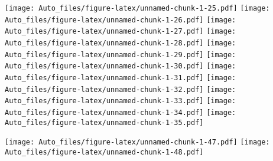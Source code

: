 \documentclass[
]{article}
\begin{document}
\texttt{[image: Auto\_files/figure-latex/unnamed-chunk-1-25.pdf]}
\texttt{[image: Auto\_files/figure-latex/unnamed-chunk-1-26.pdf]}
\texttt{[image: Auto\_files/figure-latex/unnamed-chunk-1-27.pdf]}
\texttt{[image: Auto\_files/figure-latex/unnamed-chunk-1-28.pdf]}
\texttt{[image: Auto\_files/figure-latex/unnamed-chunk-1-29.pdf]}
\texttt{[image: Auto\_files/figure-latex/unnamed-chunk-1-30.pdf]}
\texttt{[image: Auto\_files/figure-latex/unnamed-chunk-1-31.pdf]}
\texttt{[image: Auto\_files/figure-latex/unnamed-chunk-1-32.pdf]}
\texttt{[image: Auto\_files/figure-latex/unnamed-chunk-1-33.pdf]}
\texttt{[image: Auto\_files/figure-latex/unnamed-chunk-1-34.pdf]}
\texttt{[image: Auto\_files/figure-latex/unnamed-chunk-1-35.pdf]}

\texttt{[image: Auto\_files/figure-latex/unnamed-chunk-1-47.pdf]}
\texttt{[image: Auto\_files/figure-latex/unnamed-chunk-1-48.pdf]}
\end{document}
